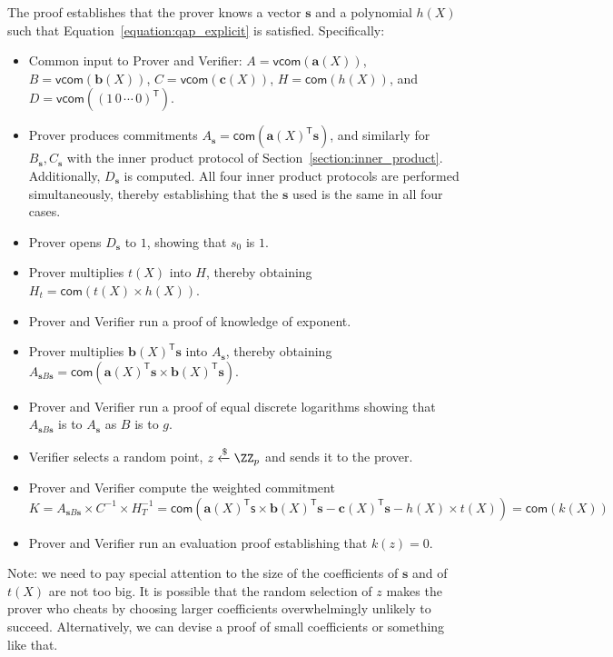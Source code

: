 \documentclass{article}
\theoremstyle{definition}
\begin{document}
The proof establishes that the prover knows a vector $\mathbf{s}$ and a polynomial $h(X)$ such that Equation~\ref{equation:qap_explicit} is satisfied. Specifically:
\begin{itemize}
    \item Common input to Prover and Verifier: $A = \mathsf{vcom}(\mathbf{a}(X))$, $B = \mathsf{vcom}(\mathbf{b}(X))$, $C = \mathsf{vcom}(\mathbf{c}(X))$, $H = \mathsf{com}(h(X))$, and $D = \mathsf{vcom}((1 \, 0 \, \cdots \, 0)^\mathsf{T})$.
    \item Prover produces commitments $A_\mathbf{s} = \mathsf{com}(\mathbf{a}(X)^\mathsf{T} \mathbf{s})$, and similarly for $B_\mathbf{s}, C_\mathbf{s}$ with the inner product protocol of Section~\ref{section:inner_product}. Additionally, $D_\mathbf{s}$ is computed. All four inner product protocols are performed simultaneously, thereby establishing that the $\mathbf{s}$ used is the same in all four cases.
    \item Prover opens $D_\mathbf{s}$ to $1$, showing that $s_0$ is $1$.
    \item Prover multiplies $t(X)$ into $H$, thereby obtaining $H_t = \mathsf{com}(t(X) \times h(X))$.
    \item Prover and Verifier run a proof of knowledge of exponent.
    \item Prover multiplies $\mathbf{b}(X)^\mathsf{T} \mathbf{s}$ into $A_\mathbf{s}$, thereby obtaining $A_{\mathbf{s}B\mathbf{s}} = \mathsf{com}(\mathbf{a}(X)^\mathsf{T} \mathbf{s} \times \mathbf{b}(X)^\mathsf{T} \mathbf{s})$.
    \item Prover and Verifier run a proof of equal discrete logarithms showing that $A_{\mathbf{s}B\mathbf{s}}$ is to $A_\mathbf{s}$ as $B$ is to $g$.
    \item Verifier selects a random point, $z \xleftarrow{\$} \ZZ_p$ and sends it to the prover.
    \item Prover and Verifier compute the weighted commitment $K = A_{\mathbf{s}B\mathbf{s}} \times C^{-1} \times H_T^{-1} = \mathsf{com}(\mathbf{a}(X)^\mathsf{T} \mathsf{s} \times \mathbf{b}(X)^\mathsf{T} \mathbf{s} - \mathbf{c}(X)^\mathsf{T} \mathbf{s} - h(X) \times t(X)) = \mathsf{com}(k(X))$
    \item Prover and Verifier run an evaluation proof establishing that $k(z) = 0$.
\end{itemize}

Note: we need to pay special attention to the size of the coefficients of $\mathbf{s}$ and of $t(X)$ are not too big. It is possible that the random selection of $z$ makes the prover who cheats by choosing larger coefficients overwhelmingly unlikely to succeed. Alternatively, we can devise a proof of small coefficients or something like that.
\end{document}
